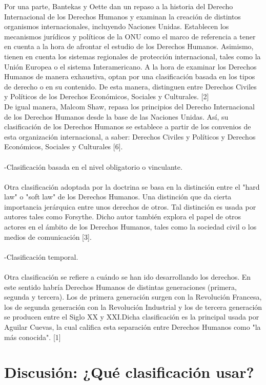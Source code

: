 \documentclass[10pt,a4paper]{article}
\begin{document}
Por una parte, Bantekas y Oette dan un repaso a la historia del Derecho Internacional de los Derechos Humanos y examinan la creación de distintos organismos internacionales, incluyendo Naciones Unidas. Establecen los mecanismos jurídicos y políticos de la ONU como el marco de referencia a tener en cuenta a la hora de afrontar el estudio de los Derechos Humanos. Asimismo, tienen en cuenta los sistemas regionales de protección internacional, tales como la Unión Europea o el sistema Interamericano. A la hora de examinar los Derechos Humanos de manera exhaustiva, optan por una clasificación basada en los tipos de derecho o en su contenido. De esta manera, distinguen entre Derechos Civiles  y Políticos de los Derechos Económicos, Sociales y Culturales. [2]\\
De igual manera, Malcom Shaw, repasa los principios del Derecho Internacional de los Derechos Humanos desde la base de las Naciones Unidas. Así, su clasificación de los Derechos Humanos se establece a partir de los convenios de esta organización internacional, a saber: Derechos Civiles y Políticos y Derechos Económicos, Sociales y Culturales [6].\\
\\
-Clasificación basada en el nivel obligatorio o vinculante.\\
\\
Otra clasificación adoptada por la doctrina se basa en la distinción entre el "hard law" o "soft law" de los Derechos Humanos. Una distinción que da cierta importancia jerárquica entre unos derechos de otros. Tal distinción es usada por autores tales como Forsythe. Dicho autor también explora el papel de otros actores en el ámbito de los Derechos Humanos, tales como la sociedad civil o los medios de comunicación [3].\\
\\
-Clasificación temporal.\\
\\
Otra clasificación se refiere a cuándo se han ido desarrollando los derechos. En este sentido habría Derechos Humanos de distintas generaciones (primera, segunda y tercera). Los de primera generación surgen con la Revolución Francesa, los de segunda generación con la Revolución Industrial y los de tercera generación se producen entre el Siglo XX y XXI.Dicha clasificación es la principal usada por Aguilar Cuevas, la cual califica esta separación entre Derechos Humanos como "la más conocida". [1]
\newpage
\section{Discusión: ¿Qué clasificación usar?}
\end{document}
